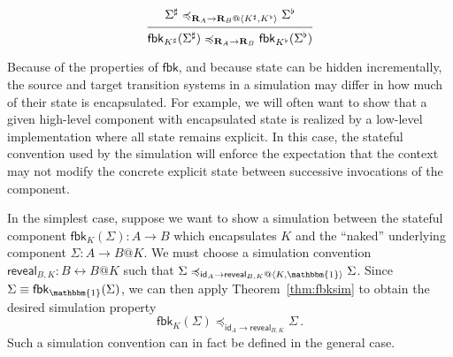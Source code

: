 \documentclass[acmsmall,screen,review,anonymous]{acmart}
\newcommand{\kw}[1]{\ensuremath{ \mathsf{#1} }}
\renewcommand{\preceq}{\preccurlyeq}
\begin{document}
\begin{lemma} \label{thm:fbksim}
\[
  \begin{prooftree}
    \hypo{\Sigma^\sharp
      \preceq_{\mathbf{R}_A \rightarrow
	       \mathbf{R}_B@\langle K^\sharp,K^\flat \rangle}
      \Sigma^\flat}
    \infer1{\kw{fbk}_{K^\sharp}(\Sigma^\sharp)
      \preceq_{\mathbf{R}_A \rightarrow \mathbf{R}_B}
      \kw{fbk}_{K^\flat}(\Sigma^\flat)}
  \end{prooftree}
\]
\end{lemma}

Because of the properties of $\kw{fbk}$,
and because state can be hidden incrementally,
the source and target transition systems in a simulation
may differ in how much of their state is encapsulated.
For example,
we will often want to show that
a given high-level component with encapsulated state
is realized by a low-level implementation
where all state remains explicit.
In this case,
the stateful convention used by the simulation
will enforce the expectation that
the context may not modify the concrete explicit state
between successive invocations of the component.

In the simplest case,
suppose we want to show a simulation between the stateful component
$\kw{fbk}_K(\Sigma) : A \rightarrow B$ which encapsulates $K$
and the ``naked'' underlying component $\Sigma : A \rightarrow B@K$.
We must choose a simulation convention
$\kw{reveal}_{B,K} : B \leftrightarrow B@K$ such that
$
  \Sigma
  \preceq_{\kw{id}_A \rightarrow \kw{reveal}_{B,K}@\langle K, \mathbbm{1} \rangle}
  \Sigma
$.
Since $\Sigma \equiv \kw{fbk}_\mathbbm{1}(\Sigma)$,
we can then apply Theorem~\ref{thm:fbksim} to obtain
the desired simulation property
\[
  \kw{fbk}_K(\Sigma)
  \preceq_{\kw{id}_A \rightarrow \kw{reveal}_{B,K}}
  \Sigma
  \,.
\]
Such a simulation convention can in fact be defined in the general case.
\end{document}
